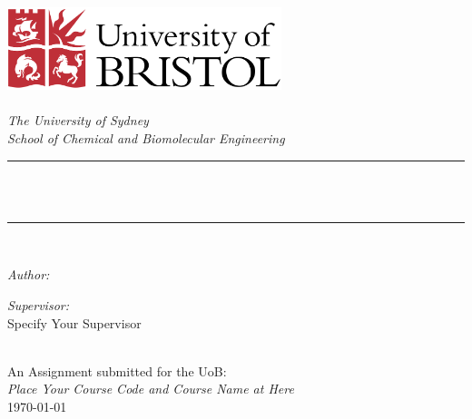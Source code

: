 \begin{titlepage}
\newcommand{\HRule}{\rule{\linewidth}{0.5mm}}
\includegraphics[width=8cm]{University_of_Bristol_logo.png}\\[1cm] 
\center 
\quad\\[1.5cm]
\textsl{\Large The University of Sydney}\\[0.5cm] 
\textsl{\large School of Chemical and Biomolecular Engineering}\\[0.5cm] 
\makeatletter
\HRule \\[0.4cm]
{ \huge \bfseries \@title}\\[0.4cm] 
\HRule \\[1.5cm]
\begin{minipage}{0.4\textwidth}
\begin{flushleft} \large
\emph{Author:}\\
\@author 
\end{flushleft}
\end{minipage}

\begin{minipage}{0.4\textwidth}
\begin{flushright} \large
\emph{Supervisor:} \\
\textup{Specify Your Supervisor}
\end{flushright}
\end{minipage}\\[3cm]
\makeatother
{\large An Assignment submitted for the UoB:}\\[0.5cm]
{\large \emph{Place Your Course Code and Course Name at Here}}\\[0.5cm]
{\large \today}\\[2cm] 
\vfill 
\end{titlepage}